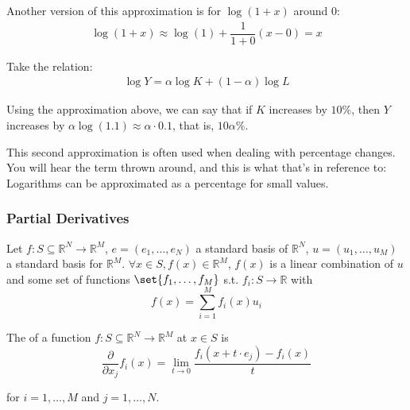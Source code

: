 \documentclass{article}
\begin{document}
\begin{example}
\begin{itemize}[label=$\bullet$]
      Another version of this approximation is for $\log(1 + x)$ around $0$:
      \begin{align*}
        \log(1 + x) \approx \log(1) + \dfrac{1}{1 + 0} (x - 0) = x
      \end{align*}

      Take the relation:
      \begin{align*}
        \log Y = \alpha \log K + (1 - \alpha) \log L
      \end{align*}

      Using the approximation above, we can say that if $K$ increases by $10\%$, then $Y$ increases by $\alpha \log (1.1) \approx \alpha \cdot 0.1$, that is, $10\alpha \%$.
  \end{itemize}

  This second approximation is often used when dealing with percentage changes. You will hear the term   thrown around, and this is what that's in reference to: Logarithms can be approximated as a percentage for small values.
\end{example}

\subsubsection{Partial Derivatives}
\label{ssub:partial_derivatives}

\begin{definition}
  Let $f: S \subseteq \mathbb{R}^N \to \mathbb{R}^M$, $e = (e_1, \ldots, e_N)$ a standard basis of $\mathbb{R}^N$, $u = (u_1, \ldots, u_M)$ a standard basis for $\mathbb{R}^M$. $\forall x \in S, f(x) \in \mathbb{R}^M$, $f(x)$ is a linear combination of $u$ and some set of functions $\set{f_1, \ldots, f_M}$ s.t. $f_i: S \to \mathbb{R}$ with
  \[
    f(x) = \sum^{M}_{i = 1} f_i(x) u_i
  \]
\end{definition}

\begin{definition}
  The  of a function $f: S \subseteq \mathbb{R}^N \to \mathbb{R}^M$ at $x \in S$ is
  \[
    \dfrac{\partial}{\partial x_j} f_i(x) = \lim_{t \to 0} \dfrac{f_i(x + t \cdot e_j) - f_i(x)}{t}
  \]

  for $i = 1, \ldots, M$ and $j = 1, \ldots, N$.
\end{definition}

%
\end{document}
